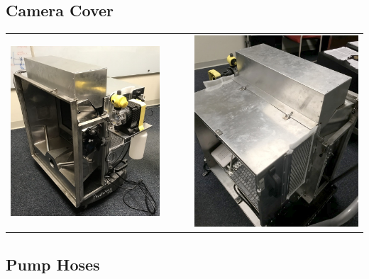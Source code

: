 %
%
\subsection{Camera Cover}
\label{sect-setup-howto-cover}

\begin{tabular}{ccc}
\includegraphics[height=0.47\columnwidth]
{photos/install-20181106/cover-front.jpg} &
~~~ &
\includegraphics[height=0.47\columnwidth]
{photos/install-20181106/cover-back.jpg} \\
\end{tabular}

%
%
\clearpage
\subsection{Pump Hoses}
\label{sect-setup-howto-hoses}


%
